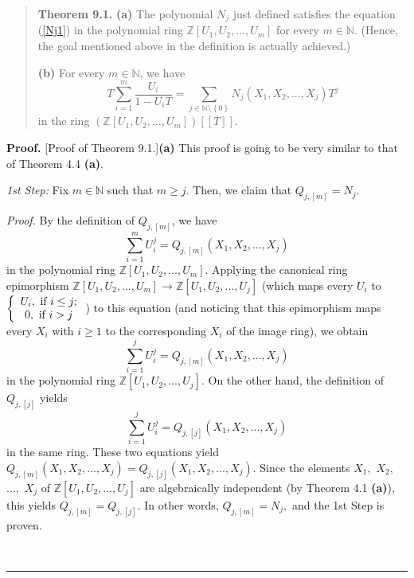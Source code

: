 \documentclass[numbers=enddot,12pt,final,onecolumn,notitlepage]{scrartcl}%
\newenvironment{proof}[1][Proof]{\noindent\textbf{#1.} }{\ \rule{0.5em}{0.5em}}
\begin{document}
\begin{quote}
\textbf{Theorem 9.1.} \textbf{(a)} The polynomial $N_{j}$ just defined
satisfies the equation (\ref{Nj1}) in the polynomial ring $\mathbb{Z}\left[
U_{1},U_{2},...,U_{m}\right]  $ for every $m\in\mathbb{N}$. (Hence, the goal
mentioned above in the definition is actually achieved.)

\textbf{(b)} For every $m\in\mathbb{N}$, we have%
\begin{equation}
T\sum_{i=1}^{m}\dfrac{U_{i}}{1-U_{i}T}=\sum_{j\in\mathbb{N}\setminus\left\{
0\right\}  }N_{j}\left(  X_{1},X_{2},...,X_{j}\right)  T^{j} \label{Nj2}%
\end{equation}
in the ring $\left(  \mathbb{Z}\left[  U_{1},U_{2},...,U_{m}\right]  \right)
\left[  \left[  T\right]  \right]  $.
\end{quote}

\begin{proof}
[Proof of Theorem 9.1.]\textbf{(a)} This proof is going to be very similar to
that of Theorem 4.4 \textbf{(a)}.

\textit{1st Step:} Fix $m\in\mathbb{N}$ such that $m\geq j$. Then, we claim
that $Q_{j,\left[  m\right]  }=N_{j}$.

\textit{Proof.} By the definition of $Q_{j,\left[  m\right]  }$, we have%
\[
\sum_{i=1}^{m}U_{i}^{j}=Q_{j,\left[  m\right]  }\left(  X_{1},X_{2}%
,...,X_{j}\right)
\]
in the polynomial ring $\mathbb{Z}\left[  U_{1},U_{2},...,U_{m}\right]  $.
Applying the canonical ring epimorphism $\mathbb{Z}\left[  U_{1}%
,U_{2},...,U_{m}\right]  \rightarrow\mathbb{Z}\left[  U_{1},U_{2}%
,...,U_{j}\right]  $ (which maps every $U_{i}$ to $\left\{
\begin{array}
[c]{c}%
U_{i},\text{ if }i\leq j;\\
0,\text{ if }i>j
\end{array}
\right.  $) to this equation (and noticing that this epimorphism maps every
$X_{i}$ with $i\geq1$ to the corresponding $X_{i}$ of the image ring), we
obtain%
\[
\sum_{i=1}^{j}U_{i}^{j}=Q_{j,\left[  m\right]  }\left(  X_{1},X_{2}%
,...,X_{j}\right)
\]
in the polynomial ring $\mathbb{Z}\left[  U_{1},U_{2},...,U_{j}\right]  $. On
the other hand, the definition of $Q_{j,\left[  j\right]  }$ yields%
\[
\sum_{i=1}^{j}U_{i}^{j}=Q_{j,\left[  j\right]  }\left(  X_{1},X_{2}%
,...,X_{j}\right)
\]
in the same ring. These two equations yield $Q_{j,\left[  m\right]  }\left(
X_{1},X_{2},...,X_{j}\right)  =Q_{j,\left[  j\right]  }\left(  X_{1}%
,X_{2},...,X_{j}\right)  $. Since the elements $X_{1},$ $X_{2},$ $...,$
$X_{j}$ of $\mathbb{Z}\left[  U_{1},U_{2},...,U_{j}\right]  $ are
algebraically independent (by Theorem 4.1 \textbf{(a)}), this yields
$Q_{j,\left[  m\right]  }=Q_{j,\left[  j\right]  }$. In other words,
$Q_{j,\left[  m\right]  }=N_{j},$ and the 1st Step is proven.


\end{proof}
\end{document}

